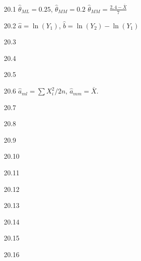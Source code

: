\protect \hypertarget {soln:20.1}{}
\begin{solution}{{20.1}}
  $\hat{\theta}_{ML}=0.25$, $\hat{\theta}_{MM}=0.2$
  $\hat{\theta}_{MM}=\frac{2{,}4-\bar{X}}{7}$
\end{solution}
\protect \hypertarget {soln:20.2}{}
\begin{solution}{{20.2}}
$\hat{a}=\ln(Y_{1})$, $\hat{b}=\ln(Y_{2})-\ln(Y_{1})$
\end{solution}
\protect \hypertarget {soln:20.3}{}
\begin{solution}{{20.3}}
\end{solution}
\protect \hypertarget {soln:20.4}{}
\begin{solution}{{20.4}}
\end{solution}
\protect \hypertarget {soln:20.5}{}
\begin{solution}{{20.5}}
\end{solution}
\protect \hypertarget {soln:20.6}{}
\begin{solution}{{20.6}}
$\hat{a}_{ml}=\sum X_i^2/2n$, $\hat{a}_{mm}=\bar{X}$.
\end{solution}
\protect \hypertarget {soln:20.7}{}
\begin{solution}{{20.7}}
\end{solution}
\protect \hypertarget {soln:20.8}{}
\begin{solution}{{20.8}}
\end{solution}
\protect \hypertarget {soln:20.9}{}
\begin{solution}{{20.9}}
\end{solution}
\protect \hypertarget {soln:20.10}{}
\begin{solution}{{20.10}}
\end{solution}
\protect \hypertarget {soln:20.11}{}
\begin{solution}{{20.11}}
\end{solution}
\protect \hypertarget {soln:20.12}{}
\begin{solution}{{20.12}}
\end{solution}
\protect \hypertarget {soln:20.13}{}
\begin{solution}{{20.13}}
\end{solution}
\protect \hypertarget {soln:20.14}{}
\begin{solution}{{20.14}}
\end{solution}
\protect \hypertarget {soln:20.15}{}
\begin{solution}{{20.15}}
\end{solution}
\protect \hypertarget {soln:20.16}{}
\begin{solution}{{20.16}}
\end{solution}

